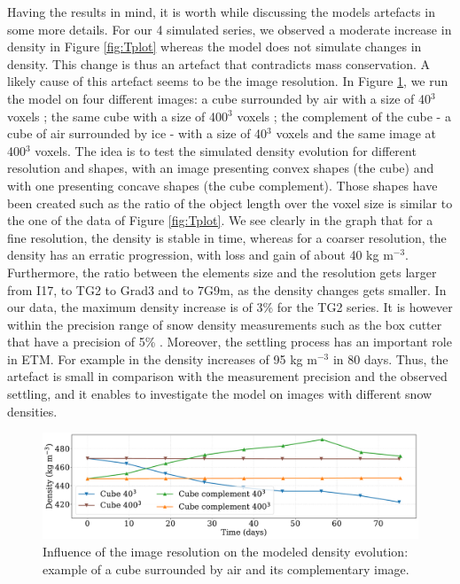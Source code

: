 \documentclass[draft,ms]{agujournal2019}
\begin{document}
Having the results in mind, it is worth while discussing the models artefacts in some more details. 
For our 4 simulated series, we observed a moderate increase in density in Figure \ref{fig:Tplot} whereas the model does not simulate changes in density. This change is thus an artefact that contradicts mass conservation. A likely cause of this artefact seems to be the image resolution. In Figure \ref{fig:cubes}, we run the model on four different images: a cube surrounded by air with a size of 40$^3$ voxels ; the same cube with a size of 400$^3$ voxels ; the complement of the cube - a cube of air surrounded by ice - with a size of 40$^3$ voxels and the same image at 400$^3$ voxels. The idea is to test the simulated density evolution for different resolution and shapes, with an image presenting convex shapes (the cube) and with one presenting concave shapes (the cube complement). Those shapes have been created such as the ratio of the object length over the voxel size is similar to the one of the data of Figure \ref{fig:Tplot}. We see clearly in the graph that for a fine resolution, the density is stable in time, whereas for a coarser resolution, the density has an erratic progression, with loss and gain of about 40 kg m$^{-3}$. Furthermore, the ratio between the elements size and the resolution gets larger from I17, to TG2 to Grad3 and to 7G9m, as the density changes gets smaller. In our data, the maximum density increase is of 3\% for the TG2 series. It is however within the precision range of snow density measurements such as the box cutter that have a precision of 5\% \cite{proksch2016intercomparison}. Moreover, the settling process has an important role in ETM. For example in  the density increases of 95 kg m$^{-3}$ in 80 days. Thus, the artefact is small in comparison with the measurement precision and the observed settling, and it enables to investigate the model on images with different snow densities.\\
\begin{figure}
    \centering
    \includegraphics[width=0.9\linewidth]{Figures/cubes_compl_density_propre.pdf}
    \caption{Influence of the image resolution on the modeled density evolution: example of a cube surrounded by air and its complementary image.}
    \label{fig:cubes}
\end{figure}
\end{document}
